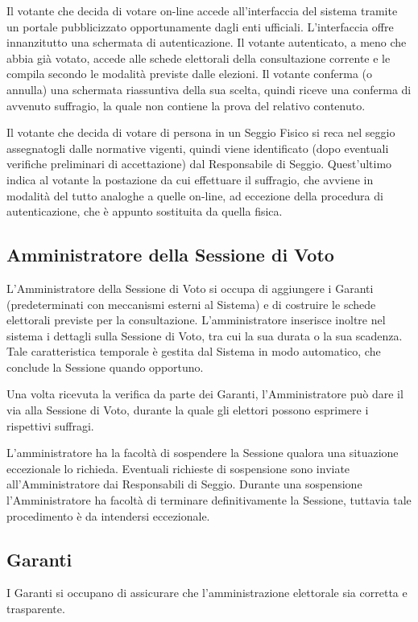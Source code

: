 \documentclass{report}
\begin{document}
Il votante che decida di votare on-line accede all'interfaccia del sistema tramite un portale pubblicizzato opportunamente dagli enti ufficiali. L'interfaccia offre innanzitutto una schermata di autenticazione. Il votante autenticato, a meno che abbia già votato, accede alle schede elettorali della consultazione corrente e le compila secondo le modalità previste dalle elezioni. Il votante conferma (o annulla) una schermata riassuntiva della sua scelta, quindi riceve una conferma di avvenuto suffragio, la quale non contiene la prova del relativo contenuto.

Il votante che decida di votare di persona in un Seggio Fisico si reca nel seggio assegnatogli dalle normative vigenti, quindi viene identificato (dopo eventuali verifiche preliminari di accettazione) dal Responsabile di Seggio. Quest'ultimo indica al votante la postazione da cui effettuare il suffragio, che avviene in modalità del tutto analoghe a quelle on-line, ad eccezione della procedura di autenticazione, che è appunto sostituita da quella fisica.


\subsection{Amministratore della Sessione di Voto}
L'Amministratore della Sessione di Voto si occupa di aggiungere i Garanti (predeterminati con meccanismi esterni al Sistema) e di costruire le schede elettorali previste per la consultazione. L'amministratore inserisce inoltre nel sistema i dettagli sulla Sessione di Voto, tra cui la sua durata o la sua scadenza. Tale caratteristica temporale è gestita dal Sistema in modo automatico, che conclude la Sessione quando opportuno.

Una volta ricevuta la verifica da parte dei Garanti, l'Amministratore può dare il via alla Sessione di Voto, durante la quale gli elettori possono esprimere i rispettivi suffragi. 

L'amministratore ha la facoltà di sospendere la Sessione qualora una situazione eccezionale lo richieda. Eventuali richieste di sospensione sono inviate all'Amministratore dai Responsabili di Seggio. Durante una sospensione l'Amministratore ha facoltà di terminare definitivamente la Sessione, tuttavia tale procedimento è da intendersi eccezionale.


\subsection{Garanti}
I Garanti si occupano di assicurare che l'amministrazione elettorale sia corretta e trasparente.
\end{document}
